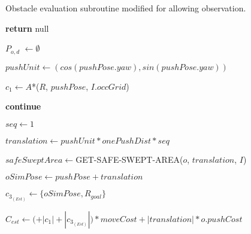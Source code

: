 \begin{algorithm}[H]
  \begin{algorithmic}[1]

    \caption{Obstacle evaluation subroutine modified for allowing observation.}

    \label{alg:04-custom-observation-planforobstacle}


        \State \textbf{return} null
      \EndIf

      \State $P_{o,d}$ $\gets \emptyset$

        \State $pushUnit \gets (cos(pushPose.yaw), sin(pushPose.yaw))$

        \State $c_{1} \gets A$*($R$, $pushPose$, $I.occGrid$)

          \State \textbf{continue}
        \EndIf

        \State {}


          \State {}

            \State {} \Comment{}
          \Else
            \State {}

              \State {}
            \EndIf
          \EndIf
        \EndIf

        \State $seq \gets 1$

        \State $translation \gets pushUnit * onePushDist * seq$

        \State $safeSweptArea \gets $GET-SAFE-SWEPT-AREA($o$, $translation$, $I$)

        \State $oSimPose \gets pushPose + translation$

        \State $c_{3_{(Est)}} \gets \{oSimPose, R_{goal}\}$

        \State $C_{est} \gets ($$ + |c_{1}| + |c_{3_{(Est)}}|) * moveCost + |translation| * o.pushCost$


\end{algorithmic}
\end{algorithm}
